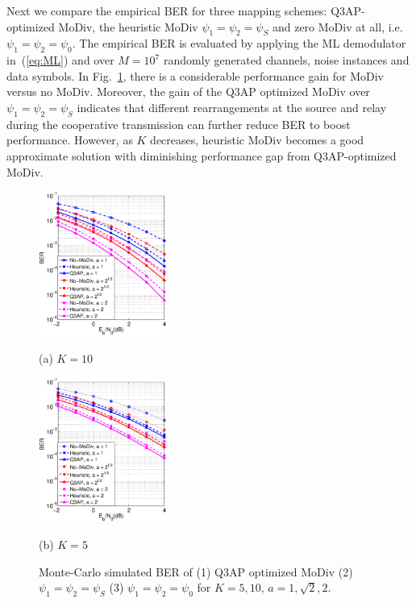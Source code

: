 \documentclass[journal]{IEEEtran}
\begin{document}
Next we compare the empirical BER for three mapping schemes: Q3AP-optimized
MoDiv, the heuristic MoDiv $\psi_1 = \psi_2 = \psi_S$  and zero MoDiv at all,
i.e. $\psi_1 = \psi_2 = \psi_0$. The empirical BER is evaluated by applying the
ML demodulator in~(\ref{eq:ML}) and over $M=10^7$ randomly generated channels, 
noise instances and data symbols. In Fig.~\ref{fig:montecarlo}, there is a
considerable performance gain for MoDiv versus no MoDiv. Moreover, the gain of
the Q3AP optimized MoDiv over $\psi_1 = \psi_2 = \psi_S$ indicates that
different rearrangements at the source and relay during the cooperative
transmission can further reduce BER to boost performance. However, as $K$
decreases, heuristic MoDiv becomes a good approximate solution with diminishing
performance gap from Q3AP-optimized MoDiv.

\begin{figure}[!t]
    \begin{minipage}[b]{0.49\linewidth}
      \centering
      \centerline{\includegraphics[width=4.2cm]{./figs/MC_10.eps}}
      \centerline{(a) $ K = 10$}\medskip
    \end{minipage}
    \hfill
    \begin{minipage}[b]{0.49\linewidth}
      \centering
      \centerline{\includegraphics[width=4.2cm]{./figs/MC_5.eps}}
      \centerline{(b) $K=5$}\medskip
    \end{minipage}
    \caption{Monte-Carlo simulated BER of (1) Q3AP optimized MoDiv
    (2) $\psi_1 = \psi_2 = \psi_S$ (3) $\psi_1 = \psi_2 = \psi_0$ for $K = 5,
    10$, $a = 1, \sqrt{2}, 2$.}
    \label{fig:montecarlo}
\end{figure}
\end{document}

